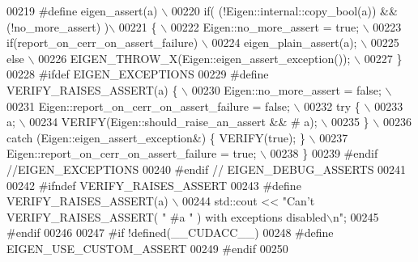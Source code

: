 \begin{DoxyCode}
00219 \textcolor{preprocessor}{    #define eigen\_assert(a) \(\backslash\)}
00220 \textcolor{preprocessor}{      if( (!Eigen::internal::copy\_bool(a)) && (!no\_more\_assert) )\(\backslash\)}
00221 \textcolor{preprocessor}{      \{                                       \(\backslash\)}
00222 \textcolor{preprocessor}{        Eigen::no\_more\_assert = true;         \(\backslash\)}
00223 \textcolor{preprocessor}{        if(report\_on\_cerr\_on\_assert\_failure)  \(\backslash\)}
00224 \textcolor{preprocessor}{          eigen\_plain\_assert(a);              \(\backslash\)}
00225 \textcolor{preprocessor}{        else                                  \(\backslash\)}
00226 \textcolor{preprocessor}{          EIGEN\_THROW\_X(Eigen::eigen\_assert\_exception()); \(\backslash\)}
00227 \textcolor{preprocessor}{      \}}
00228 \textcolor{preprocessor}{    #ifdef EIGEN\_EXCEPTIONS}
00229 \textcolor{preprocessor}{      #define VERIFY\_RAISES\_ASSERT(a) \{                           \(\backslash\)}
00230 \textcolor{preprocessor}{        Eigen::no\_more\_assert = false;                            \(\backslash\)}
00231 \textcolor{preprocessor}{        Eigen::report\_on\_cerr\_on\_assert\_failure = false;          \(\backslash\)}
00232 \textcolor{preprocessor}{        try \{                                                     \(\backslash\)}
00233 \textcolor{preprocessor}{          a;                                                      \(\backslash\)}
00234 \textcolor{preprocessor}{          VERIFY(Eigen::should\_raise\_an\_assert && # a);           \(\backslash\)}
00235 \textcolor{preprocessor}{        \}                                                         \(\backslash\)}
00236 \textcolor{preprocessor}{        catch (Eigen::eigen\_assert\_exception&) \{ VERIFY(true); \}  \(\backslash\)}
00237 \textcolor{preprocessor}{        Eigen::report\_on\_cerr\_on\_assert\_failure = true;           \(\backslash\)}
00238 \textcolor{preprocessor}{      \}}
00239 \textcolor{preprocessor}{    #endif //EIGEN\_EXCEPTIONS}
00240 \textcolor{preprocessor}{  #endif // EIGEN\_DEBUG\_ASSERTS}
00241 
00242 \textcolor{preprocessor}{#ifndef VERIFY\_RAISES\_ASSERT}
00243 \textcolor{preprocessor}{  #define VERIFY\_RAISES\_ASSERT(a) \(\backslash\)}
00244 \textcolor{preprocessor}{    std::cout << "Can't VERIFY\_RAISES\_ASSERT( " #a " ) with exceptions disabled\(\backslash\)n";}
00245 \textcolor{preprocessor}{#endif}
00246     
00247 \textcolor{preprocessor}{  #if !defined(\_\_CUDACC\_\_)}
00248 \textcolor{preprocessor}{  #define EIGEN\_USE\_CUSTOM\_ASSERT}
00249 \textcolor{preprocessor}{  #endif}
00250 

\end{DoxyCode}
